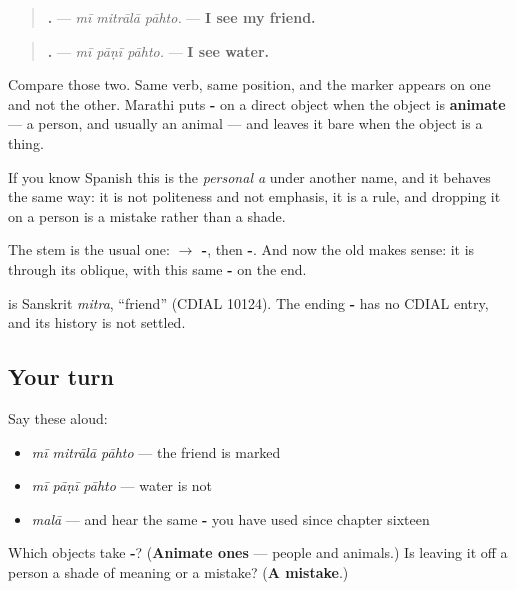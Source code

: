 \begin{grammarlens}[title={Grammar Lens: a person you act on takes -\mr{ला}; a thing does not}]
\begin{quote}
\textbf{  .} — \emph{mī mitrālā pāhto.} — \textbf{I see my friend.}
\end{quote}

\begin{quote}
\textbf{  .} — \emph{mī pāṇī pāhto.} — \textbf{I see water.}
\end{quote}

Compare those two. Same verb, same position, and the marker appears on one and not the other. Marathi puts \textbf{-} on a direct object when the object is \textbf{animate} — a person, and usually an animal — and leaves it bare when the object is a thing.

If you know Spanish this is the \emph{personal a} under another name, and it behaves the same way: it is not politeness and not emphasis, it is a rule, and dropping it on a person is a mistake rather than a shade.

The stem is the usual one: \textbf{ $\to$ -}, then \textbf{-}. And now the old \textbf{} makes sense: it is \textbf{} through its oblique, with this same \textbf{-} on the end.
\end{grammarlens}

\begin{cousinweb}
\textbf{} is Sanskrit \emph{mitra}, \textquotedblleft{}friend\textquotedblright{} (CDIAL 10124). The ending \textbf{-} has no CDIAL entry, and its history is not settled.
\end{cousinweb}

\subsection*{Your turn}
Say these aloud:

\begin{itemize}
\raggedright
  \item \emph{mī mitrālā pāhto} — the friend is marked
  \item \emph{mī pāṇī pāhto} — water is not
  \item \emph{malā} — and hear the same \textbf{-} you have used since chapter sixteen
\end{itemize}

\begin{tcolorbox}[breakable,colback=teal!4,colframe=teal!35!black,title={Before you move on}]
Which objects take \textbf{-}? (\textbf{Animate ones} — people and animals.) Is leaving it off a person a shade of meaning or a mistake? (\textbf{A mistake}.)
\end{tcolorbox}

